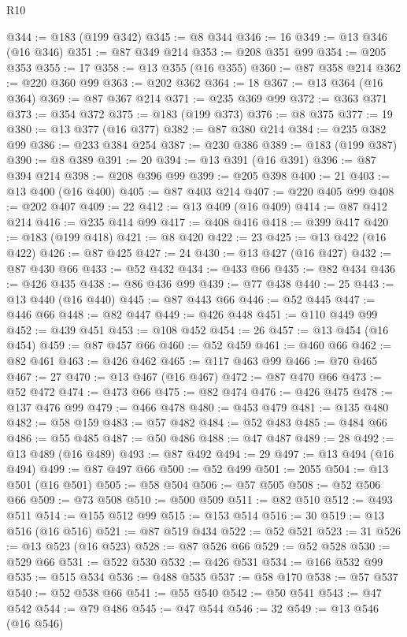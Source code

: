 \begin{lexlean}{R10}
\begin{coremodule}
@344 := @183 (@199 @342)
@345 := @8 @344
@346 := 16
@349 := @13 @346 (@16 @346)
@351 := @87 @349 @214
@353 := @208 @351 @99
@354 := @205 @353
@355 := 17
@358 := @13 @355 (@16 @355)
@360 := @87 @358 @214
@362 := @220 @360 @99
@363 := @202 @362
@364 := 18
@367 := @13 @364 (@16 @364)
@369 := @87 @367 @214
@371 := @235 @369 @99
@372 := @363 @371
@373 := @354 @372
@375 := @183 (@199 @373)
@376 := @8 @375
@377 := 19
@380 := @13 @377 (@16 @377)
@382 := @87 @380 @214
@384 := @235 @382 @99
@386 := @233 @384 @254
@387 := @230 @386
@389 := @183 (@199 @387)
@390 := @8 @389
@391 := 20
@394 := @13 @391 (@16 @391)
@396 := @87 @394 @214
@398 := @208 @396 @99
@399 := @205 @398
@400 := 21
@403 := @13 @400 (@16 @400)
@405 := @87 @403 @214
@407 := @220 @405 @99
@408 := @202 @407
@409 := 22
@412 := @13 @409 (@16 @409)
@414 := @87 @412 @214
@416 := @235 @414 @99
@417 := @408 @416
@418 := @399 @417
@420 := @183 (@199 @418)
@421 := @8 @420
@422 := 23
@425 := @13 @422 (@16 @422)
@426 := @87 @425
@427 := 24
@430 := @13 @427 (@16 @427)
@432 := @87 @430 @66
@433 := @52 @432
@434 := @433 @66
@435 := @82 @434
@436 := @426 @435
@438 := @86 @436 @99
@439 := @77 @438
@440 := 25
@443 := @13 @440 (@16 @440)
@445 := @87 @443 @66
@446 := @52 @445
@447 := @446 @66
@448 := @82 @447
@449 := @426 @448
@451 := @110 @449 @99
@452 := @439 @451
@453 := @108 @452
@454 := 26
@457 := @13 @454 (@16 @454)
@459 := @87 @457 @66
@460 := @52 @459
@461 := @460 @66
@462 := @82 @461
@463 := @426 @462
@465 := @117 @463 @99
@466 := @70 @465
@467 := 27
@470 := @13 @467 (@16 @467)
@472 := @87 @470 @66
@473 := @52 @472
@474 := @473 @66
@475 := @82 @474
@476 := @426 @475
@478 := @137 @476 @99
@479 := @466 @478
@480 := @453 @479
@481 := @135 @480
@482 := @58 @159
@483 := @57 @482
@484 := @52 @483
@485 := @484 @66
@486 := @55 @485
@487 := @50 @486
@488 := @47 @487
@489 := 28
@492 := @13 @489 (@16 @489)
@493 := @87 @492
@494 := 29
@497 := @13 @494 (@16 @494)
@499 := @87 @497 @66
@500 := @52 @499
@501 := 2055
@504 := @13 @501 (@16 @501)
@505 := @58 @504
@506 := @57 @505
@508 := @52 @506 @66
@509 := @73 @508
@510 := @500 @509
@511 := @82 @510
@512 := @493 @511
@514 := @155 @512 @99
@515 := @153 @514
@516 := 30
@519 := @13 @516 (@16 @516)
@521 := @87 @519 @434
@522 := @52 @521
@523 := 31
@526 := @13 @523 (@16 @523)
@528 := @87 @526 @66
@529 := @52 @528
@530 := @529 @66
@531 := @522 @530
@532 := @426 @531
@534 := @166 @532 @99
@535 := @515 @534
@536 := @488 @535
@537 := @58 @170
@538 := @57 @537
@540 := @52 @538 @66
@541 := @55 @540
@542 := @50 @541
@543 := @47 @542
@544 := @79 @486
@545 := @47 @544
@546 := 32
@549 := @13 @546 (@16 @546)

\end{coremodule}
\end{lexlean}
